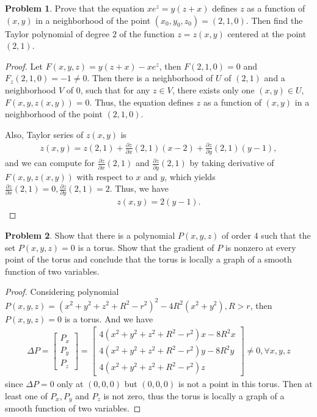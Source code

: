 \documentclass[11pt]{article}
\theoremstyle{definition}
\newtheorem{problem}{Problem}
\theoremstyle{definition}
\begin{document}
\begin{problem}
Prove that the equation $xe^z=y(z+x)$ defines $z$ as a function of $(x,y)$ in a neighborhood of the point
$(x_0,y_0,z_0)=(2,1,0)$. Then find the Taylor polynomial
of degree $2$ of the function $z=z(x,y)$ centered at the point
$(2,1)$.
\end{problem}
\begin{proof}
Let $F(x,y,z) = y(z+x) - x e^z$, then $F(2,1,0) = 0$ and $F_z(2,1,0) = -1 \neq 0$. Then there is a neighborhood of $U$ of $(2,1)$ and a neighborhood $V$ of $0$, such that for any $z\in V$, there exists only one $(x,y) \in U$, $F(x,y,z(x,y)) = 0$. Thus, the equation defines $z$ as a function of $(x,y)$ in a neighborhood of the point
$(2,1,0)$. 

Also, Taylor series of $z(x,y)$ is 
\begin{align*}
    z(x,y) = z(2,1) + \frac{\partial z}{\partial x}(2,1) (x-2) + \frac{\partial z}{\partial y}(2,1) (y-1),
\end{align*}
and we can compute for $\frac{\partial z}{\partial x}(2,1)$ and $\frac{\partial z}{\partial y}(2,1)$ by taking derivative of $F(x,y,z(x,y))$ with respect to $x$ and $y$, which yields $\frac{\partial z}{\partial x}(2,1) = 0, \frac{\partial z}{\partial y}(2,1) = 2$. Thus, we have 
\begin{align*}
    z(x,y) = 2 (y-1).
\end{align*}
\end{proof}

\medskip

\begin{problem}
Show that there is a polynomial $P(x,y,z)$ of order $4$ such that the set $P(x,y,z)=0$ is a torus. Show that the gradient of $P$ is nonzero at every point of the torus and conclude that the torus is locally a graph of a smooth function of two variables.
\end{problem}
\begin{proof}
Considering polynomial $P(x,y,z) = (x^2 + y^2 + z^2 + R^2 - r^2)^2 - 4R^2(x^2 + y^2), R > r$, then $P(x,y,z) = 0$ is a torus. And we have 
\begin{align*}
    \Delta P = \begin{bmatrix}
        P_x \\
        P_y \\
        P_z
    \end{bmatrix} = \begin{bmatrix}
        4 (x^2 + y^2 + z^2 + R^2 - r^2)x - 8 R^2 x\\
        4 (x^2 + y^2 + z^2 + R^2 - r^2)y - 8 R^2 y \\
        4 (x^2 + y^2 + z^2 + R^2 - r^2)z
    \end{bmatrix}
    \neq 0, \forall x,y,z
\end{align*}
since $\Delta P = 0$ only at $(0,0,0)$ but $(0,0,0)$ is not a point in this torus. Then at least one of $P_x, P_y$ and $P_z$ is not zero, thus the torus is locally a graph of a smooth function of two variables.
\end{proof}
\end{document}
